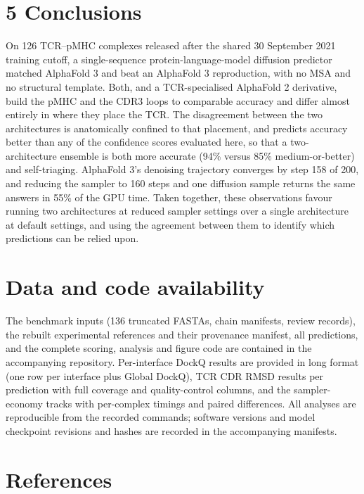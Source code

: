 \documentclass[
  11pt,
]{article}
\begin{document}
\section{5 Conclusions}\label{conclusions}

On 126 TCR--pMHC complexes released after the shared 30 September 2021
training cutoff, a single-sequence protein-language-model diffusion
predictor matched AlphaFold 3 and beat an AlphaFold 3 reproduction, with
no MSA and no structural template. Both, and a TCR-specialised AlphaFold
2 derivative, build the pMHC and the CDR3 loops to comparable accuracy
and differ almost entirely in where they place the TCR. The disagreement
between the two architectures is anatomically confined to that
placement, and predicts accuracy better than any of the confidence
scores evaluated here, so that a two-architecture ensemble is both more
accurate (94\% versus 85\% medium-or-better) and self-triaging.
AlphaFold 3's denoising trajectory converges by step 158 of 200, and
reducing the sampler to 160 steps and one diffusion sample returns the
same answers in 55\% of the GPU time. Taken together, these observations
favour running two architectures at reduced sampler settings over a
single architecture at default settings, and using the agreement between
them to identify which predictions can be relied upon.

\section{Data and code availability}\label{data-and-code-availability}

The benchmark inputs (136 truncated FASTAs, chain manifests, review
records), the rebuilt experimental references and their provenance
manifest, all predictions, and the complete scoring, analysis and figure
code are contained in the accompanying repository. Per-interface DockQ
results are provided in long format (one row per interface plus Global
DockQ), TCR CDR RMSD results per prediction with full coverage and
quality-control columns, and the sampler-economy tracks with per-complex
timings and paired differences. All analyses are reproducible from the
recorded commands; software versions and model checkpoint revisions and
hashes are recorded in the accompanying manifests.

\section{References}\label{references}
\end{document}
